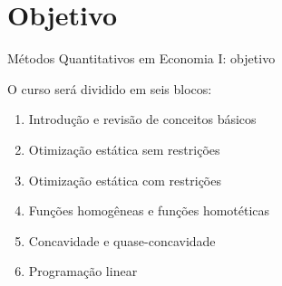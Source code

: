 \documentclass[10pt]{beamer}
\begin{document}
\section{Objetivo}
\begin{frame}{Métodos Quantitativos em Economia I: objetivo}
    \begin{center}
        \begin{minipage}{.9\textwidth}
        \end{minipage}
    \end{center}

    O curso será dividido em seis blocos:
    \begin{enumerate}
        \item Introdução e revisão de conceitos básicos

        \item Otimização estática sem restrições

        \item Otimização estática com restrições

        \item Funções homogêneas e funções homotéticas

        \item Concavidade e quase-concavidade

        \item Programação linear
    \end{enumerate}
\end{frame}
\end{document}
